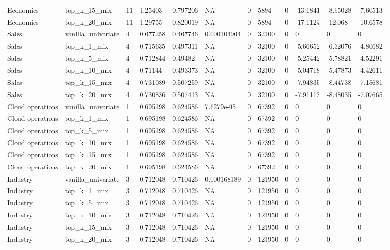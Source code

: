 \begin{tabular}{llllllllllll}
Economics & top\_k\_15\_mix & 11 & 1.25403 & 0.797206 & NA & 0 & 5894 & 0 & -13.1841 & -8.95028 & -7.60513 \\
Economics & top\_k\_20\_mix & 11 & 1.29755 & 0.820019 & NA & 0 & 5894 & 0 & -17.1124 & -12.068 & -10.6578 \\
Sales & vanilla\_univariate & 4 & 0.677258 & 0.467746 & 0.000104964 & 0 & 32100 & 0 & 0 & 0 & 0 \\
Sales & top\_k\_1\_mix & 4 & 0.715635 & 0.497311 & NA & 0 & 32100 & 0 & -5.66652 & -6.32076 & -4.80682 \\
Sales & top\_k\_5\_mix & 4 & 0.712844 & 0.49482 & NA & 0 & 32100 & 0 & -5.25442 & -5.78821 & -4.52291 \\
Sales & top\_k\_10\_mix & 4 & 0.71144 & 0.493373 & NA & 0 & 32100 & 0 & -5.04718 & -5.47873 & -4.42611 \\
Sales & top\_k\_15\_mix & 4 & 0.731089 & 0.507259 & NA & 0 & 32100 & 0 & -7.94835 & -8.44738 & -7.15681 \\
Sales & top\_k\_20\_mix & 4 & 0.730836 & 0.507413 & NA & 0 & 32100 & 0 & -7.91113 & -8.48035 & -7.07665 \\
Cloud operations & vanilla\_univariate & 1 & 0.695198 & 0.624586 & 7.6279e-05 & 0 & 67392 & 0 & 0 & 0 & 0 \\
Cloud operations & top\_k\_1\_mix & 1 & 0.695198 & 0.624586 & NA & 0 & 67392 & 0 & 0 & 0 & 0 \\
Cloud operations & top\_k\_5\_mix & 1 & 0.695198 & 0.624586 & NA & 0 & 67392 & 0 & 0 & 0 & 0 \\
Cloud operations & top\_k\_10\_mix & 1 & 0.695198 & 0.624586 & NA & 0 & 67392 & 0 & 0 & 0 & 0 \\
Cloud operations & top\_k\_15\_mix & 1 & 0.695198 & 0.624586 & NA & 0 & 67392 & 0 & 0 & 0 & 0 \\
Cloud operations & top\_k\_20\_mix & 1 & 0.695198 & 0.624586 & NA & 0 & 67392 & 0 & 0 & 0 & 0 \\
Industry & vanilla\_univariate & 3 & 0.712048 & 0.710426 & 0.000168189 & 0 & 121950 & 0 & 0 & 0 & 0 \\
Industry & top\_k\_1\_mix & 3 & 0.712048 & 0.710426 & NA & 0 & 121950 & 0 & 0 & 0 & 0 \\
Industry & top\_k\_5\_mix & 3 & 0.712048 & 0.710426 & NA & 0 & 121950 & 0 & 0 & 0 & 0 \\
Industry & top\_k\_10\_mix & 3 & 0.712048 & 0.710426 & NA & 0 & 121950 & 0 & 0 & 0 & 0 \\
Industry & top\_k\_15\_mix & 3 & 0.712048 & 0.710426 & NA & 0 & 121950 & 0 & 0 & 0 & 0 \\
Industry & top\_k\_20\_mix & 3 & 0.712048 & 0.710426 & NA & 0 & 121950 & 0 & 0 & 0 & 0 \\
\bottomrule
\end{tabular}
